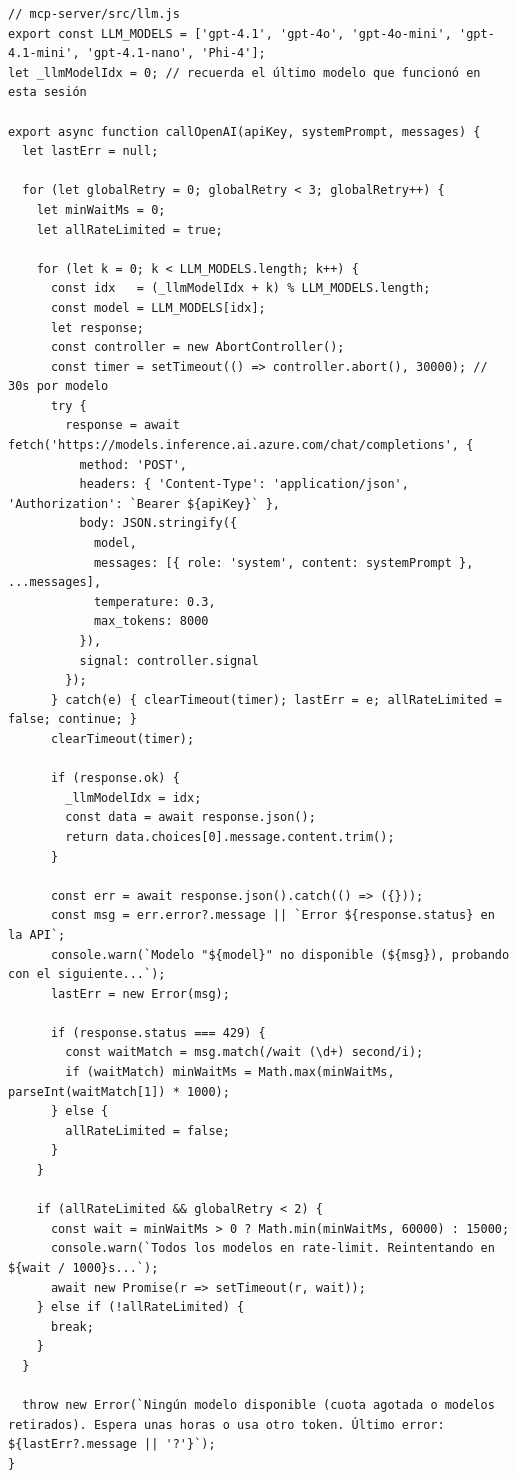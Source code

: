 \begin{lstlisting}[style=promptbox]
// mcp-server/src/llm.js
export const LLM_MODELS = ['gpt-4.1', 'gpt-4o', 'gpt-4o-mini', 'gpt-4.1-mini', 'gpt-4.1-nano', 'Phi-4'];
let _llmModelIdx = 0; // recuerda el último modelo que funcionó en esta sesión

export async function callOpenAI(apiKey, systemPrompt, messages) {
  let lastErr = null;

  for (let globalRetry = 0; globalRetry < 3; globalRetry++) {
    let minWaitMs = 0;
    let allRateLimited = true;

    for (let k = 0; k < LLM_MODELS.length; k++) {
      const idx   = (_llmModelIdx + k) % LLM_MODELS.length;
      const model = LLM_MODELS[idx];
      let response;
      const controller = new AbortController();
      const timer = setTimeout(() => controller.abort(), 30000); // 30s por modelo
      try {
        response = await fetch('https://models.inference.ai.azure.com/chat/completions', {
          method: 'POST',
          headers: { 'Content-Type': 'application/json', 'Authorization': `Bearer ${apiKey}` },
          body: JSON.stringify({
            model,
            messages: [{ role: 'system', content: systemPrompt }, ...messages],
            temperature: 0.3,
            max_tokens: 8000
          }),
          signal: controller.signal
        });
      } catch(e) { clearTimeout(timer); lastErr = e; allRateLimited = false; continue; }
      clearTimeout(timer);

      if (response.ok) {
        _llmModelIdx = idx;
        const data = await response.json();
        return data.choices[0].message.content.trim();
      }

      const err = await response.json().catch(() => ({}));
      const msg = err.error?.message || `Error ${response.status} en la API`;
      console.warn(`Modelo "${model}" no disponible (${msg}), probando con el siguiente...`);
      lastErr = new Error(msg);

      if (response.status === 429) {
        const waitMatch = msg.match(/wait (\d+) second/i);
        if (waitMatch) minWaitMs = Math.max(minWaitMs, parseInt(waitMatch[1]) * 1000);
      } else {
        allRateLimited = false;
      }
    }

    if (allRateLimited && globalRetry < 2) {
      const wait = minWaitMs > 0 ? Math.min(minWaitMs, 60000) : 15000;
      console.warn(`Todos los modelos en rate-limit. Reintentando en ${wait / 1000}s...`);
      await new Promise(r => setTimeout(r, wait));
    } else if (!allRateLimited) {
      break;
    }
  }

  throw new Error(`Ningún modelo disponible (cuota agotada o modelos retirados). Espera unas horas o usa otro token. Último error: ${lastErr?.message || '?'}`);
}
\end{lstlisting}


